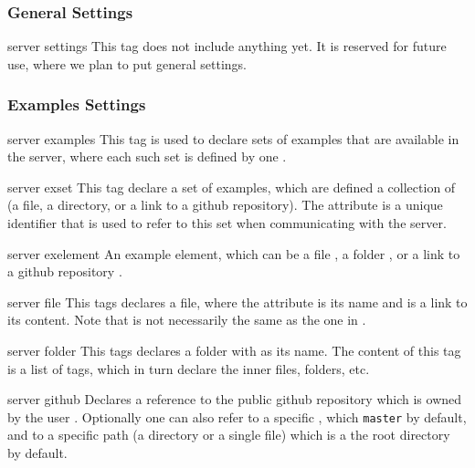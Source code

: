 \subsubsection*{General Settings}

\bigskip
\xmlstruct
{server}
{settings}
{%
%
  This tag does not include anything yet. It is reserved for future
  use, where we plan to put general settings.
%
}

\subsubsection*{Examples Settings}

\bigskip
\xmlstruct
{server}
{examples}
{%
%
  This tag is used to declare sets of examples that are available in
  the server, where each such set is defined by one
  .
%
}


\bigskip
\xmlstruct
{server}
{exset}
{%
%
  This tag declare a set of examples, which are defined a collection
  of  (a file, a directory, or a link to a
  github repository).
%
  The attribute  is a unique identifier that is used
  to refer to this set when communicating with the server.
%
}


\bigskip
\xmlstruct
{server}
{exelement}
{%
%
  An example element, which can be a file , a
  folder , or a link to a github repository
  .
%
}



\bigskip
\xmlstruct
{server}
{file}
{%
%
  This tags declares a file, where the  attribute
  is its name and  is a link to its content. Note
  that  is not necessarily the same as the one in
  .
%
}


\bigskip
\xmlstruct
{server}
{folder}
{%
%
  This tags declares a folder with  as its
  name. The content of this tag is a list of
   tags, which in turn declare the
  inner files, folders, etc.
%
}



\bigskip
\xmlstruct
{server}
{github}
{%
%
  Declares a reference to the public github repository
   which is owned by the user
  . Optionally one can also refer to a specific
  , which \texttt{master} by default, and to a
  specific path  (a directory or a single
  file) which is a the root directory by default.
%
}


